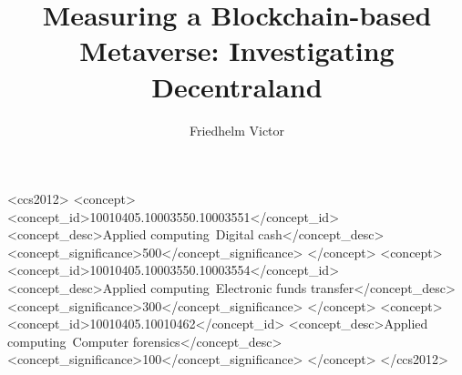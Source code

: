 \documentclass[sigconf]{acmart}
\begin{document}
\title{Measuring a Blockchain-based Metaverse: Investigating Decentraland}


\author{Friedhelm Victor}


\begin{abstract}
  
\end{abstract}

\begin{CCSXML}
<ccs2012>
<concept>
<concept_id>10010405.10003550.10003551</concept_id>
<concept_desc>Applied computing~Digital cash</concept_desc>
<concept_significance>500</concept_significance>
</concept>
<concept>
<concept_id>10010405.10003550.10003554</concept_id>
<concept_desc>Applied computing~Electronic funds transfer</concept_desc>
<concept_significance>300</concept_significance>
</concept>
<concept>
<concept_id>10010405.10010462</concept_id>
<concept_desc>Applied computing~Computer forensics</concept_desc>
<concept_significance>100</concept_significance>
</concept>
</ccs2012>
\end{CCSXML}




\maketitle








\end{document}
